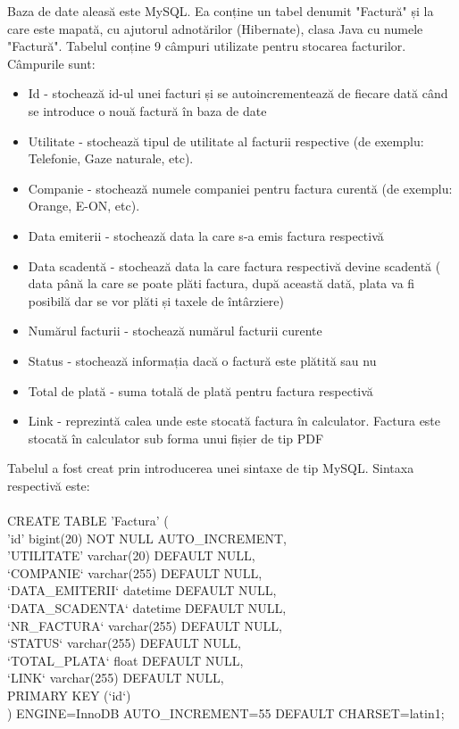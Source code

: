 \documentclass[12pt]{book}
\begin{document}
Baza de date aleasă este MySQL. Ea conține un tabel denumit "Factură" și la care este mapată, cu ajutorul adnotărilor (Hibernate), clasa Java cu numele "Factură". Tabelul conține 9 câmpuri utilizate pentru stocarea facturilor. Câmpurile sunt:
\begin{addmargin}[4em]{1em}
	\begin{itemize}
		\item Id - stochează id-ul unei facturi și se autoincrementează de fiecare dată când se introduce o nouă factură în baza de date
		\item Utilitate - stochează tipul de utilitate al facturii respective (de exemplu: Telefonie, Gaze naturale, etc).
		\item Companie - stochează numele companiei pentru factura curentă (de exemplu: Orange, E-ON, etc).
		\item Data emiterii - stochează data la care s-a emis factura respectivă
		\item Data scadentă - stochează data la care factura respectivă devine scadentă ( data până la care se poate plăti factura, după această dată, plata va fi posibilă dar se vor plăti și taxele de întârziere)
		\item Numărul facturii - stochează numărul facturii curente
		\item Status - stochează informația dacă o factură este plătită sau nu
		\item Total de plată - suma totală de plată pentru factura respectivă
		\item Link - reprezintă calea unde este stocată factura în calculator. Factura este stocată în calculator sub forma unui fișier de tip PDF
	\end{itemize}
\end{addmargin}

Tabelul a fost creat prin introducerea unei sintaxe de tip MySQL. Sintaxa respectivă este:\\\\
CREATE TABLE 'Factura' (\\
'id' bigint(20) NOT NULL AUTO\_INCREMENT,\\
'UTILITATE' varchar(20) DEFAULT NULL,\\
`COMPANIE` varchar(255) DEFAULT NULL,\\
`DATA\_EMITERII` datetime DEFAULT NULL,\\
`DATA\_SCADENTA` datetime DEFAULT NULL,\\
`NR\_FACTURA` varchar(255) DEFAULT NULL,\\
`STATUS` varchar(255) DEFAULT NULL,\\
`TOTAL\_PLATA` float DEFAULT NULL,\\
`LINK` varchar(255) DEFAULT NULL,\\
PRIMARY KEY (`id`)\\
) ENGINE=InnoDB AUTO\_INCREMENT=55 DEFAULT CHARSET=latin1;\\
\end{document}
